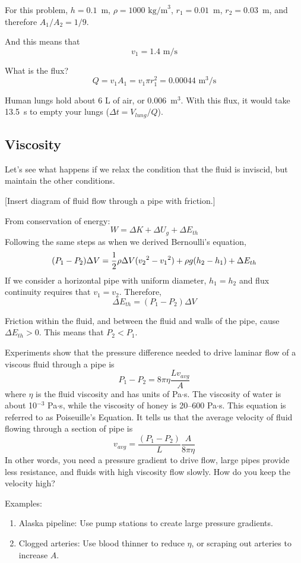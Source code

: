 For this problem, $h=0.1$~m, $\rho=1000\mbox{ kg/m}^3$, $r_1=0.01$~m, $r_2=0.03$~m, and therefore $A_1/A_2=1/9$.

And this means that
$$\boxed{v_1=1.4\mbox{ m/s}}$$

What is the flux?
$$Q=v_1A_1 = v_1\pi r_1^2 = 0.00044\mbox{ m}^3\mbox{/s}$$

Human lungs hold about 6 L of air, or 0.006~m$^3$. With this flux, it would take
13.5~s to empty your lungs ($\Delta t = V_{lung}/Q$).

\subsection{Viscosity}
Let's see what happens if we relax the condition that the fluid is inviscid, but maintain the other conditions.

[Insert diagram of fluid flow through a pipe with friction.]
\vspace{5cm}


From conservation of energy:
$$W=\Delta{K}+\Delta{U_g}+\Delta{E_{th}}$$
Following the same steps as when we derived Bernoulli's equation,
$$(P_1-P_2)\Delta{V}=\frac{1}{2}\rho\Delta V(v_2\displaystyle^2-v_1\displaystyle^2)+\rho g(h_2-h_1)+\Delta{E_{th}}$$
If we consider a horizontal pipe with uniform diameter, $h_1=h_2$ and flux continuity requires that $v_1=v_2$. Therefore,
$$\Delta{E_{th}}=(P_1-P_2)\Delta{V}$$

Friction within the fluid, and between the fluid and walls of the pipe, cause $\Delta E_{th}>0$. This means that $P_2<P_1$.

Experiments show that the pressure difference needed to drive laminar flow of a viscous fluid through a pipe is
$$P_1-P_2=8\pi\eta\frac{Lv_{avg}}{A}$$
where $\eta$ is the fluid viscosity and has units of Pa$\cdot$s. The viscosity of water is about 10$^{-3}$ Pa$\cdot$s, while the viscosity of honey is 20--600 Pa$\cdot$s. This equation is referred to as Poiseuille's Equation. It tells us that the average velocity of fluid flowing through a section of pipe is 
$$v_{avg}=\frac{(P_1-P_2)}{L}\frac{A}{8\pi\eta}$$
In other words, you need a pressure gradient to drive flow, large pipes provide less resistance, and fluids with high viscosity flow slowly. How do you keep the velocity high?

Examples:
\begin{enumerate}
\item Alaska pipeline: Use pump stations to create large pressure gradients.
\item Clogged arteries: Use blood thinner to reduce $\eta$, or scraping out arteries to increase $A$.
\end{enumerate}

